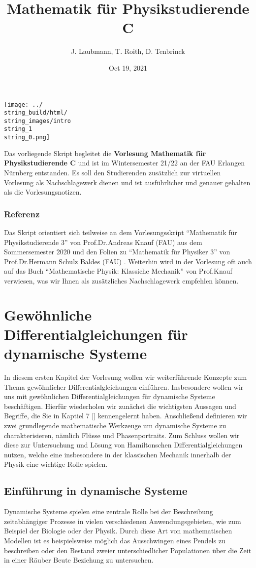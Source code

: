 \documentclass[letterpaper,10pt,english]{jupyterBook}
\title{Mathematik für Physikstudierende C}
\date{Oct 19, 2021}
\author{J.\@{} Laubmann, T.\@{} Roith, D.\@{} Tenbrinck}
\begin{document}
\label{\detokenize{intro::doc}}


\noindent\texttt{[image: ../\\string\_build/html/\\string\_images/intro\\string\_1\\string\_0.png]}

Das vorliegende Skript begleitet die \textbf{Vorlesung Mathematik für Physikstudierende C} und ist im Wintersemester 21/22 an der FAU Erlangen Nürnberg entstanden. Es soll den Studierenden zusätzlich zur virtuellen Vorlesung als Nachschlagewerk dienen und ist ausführlicher und genauer gehalten als die Vorlesungsnotizen.

\subsection{Referenz}

Das Skript orientiert sich teilweise an dem Vorlesungsskript “Mathematik für Physikstudierende 3” \cite{Kna20} von Prof.Dr.Andreas Knauf (FAU) aus dem Sommersemester 2020 und den Folien zu “Mathematik für Physiker 3” von Prof.Dr.Hermann Schulz Baldes (FAU) \cite{SB18}. Weiterhin wird in der Vorlesung oft auch auf das Buch “Mathematische Physik: Klassiche Mechanik” \cite{Kna17} von Prof.Knauf verwiesen, was wir Ihnen als zusätzliches Nachschlagewerk empfehlen können.


\chapter{Gewöhnliche Differentialgleichungen für dynamische Systeme}
\label{\detokenize{ode/ode:gewohnliche-differentialgleichungen-fur-dynamische-systeme}}\label{\detokenize{ode/ode::doc}}
In diesem ersten Kapitel der Vorlesung wollen wir weiterführende Konzepte zum Thema gewöhnlicher Differentialgleichungen einführen.
Insbesondere wollen wir uns mit gewöhnlichen Differentialgleichungen für dynamische Systeme beschäftigen.
Hierfür wiederholen wir zunächst die wichtigsten Aussagen und Begriffe, die Sie in Kaptiel 7 {[}{]} kennengelernt haben.
Anschließend definieren wir zwei grundlegende mathematische Werkzeuge um dynamische Systeme zu charakterisieren, nämlich Flüsse und Phasenportraits.
Zum Schluss wollen wir diese zur Untersuchung und Lösung von Hamiltonschen Differentialgleichungen nutzen, welche eine insbesondere in der klassischen Mechanik innerhalb der Physik eine wichtige Rolle spielen.


\section{Einführung in dynamische Systeme}
\label{\detokenize{ode/dynamicSystems:einfuhrung-in-dynamische-systeme}}\label{\detokenize{ode/dynamicSystems::doc}}
Dynamische Systeme spielen eine zentrale Rolle bei der Beschreibung zeitabhängiger Prozesse in vielen verschiedenen Anwendungsgebieten, wie zum Beispiel der Biologie oder der Physik.
Durch diese Art von mathematischen Modellen ist es beispielsweise möglich das Ausschwingen eines Pendels zu beschreiben oder den Bestand zweier unterschiedlicher Populationen über die Zeit in einer Räuber Beute Beziehung zu untersuchen.
\end{document}
